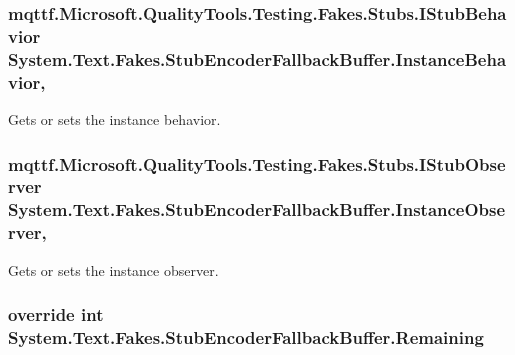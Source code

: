 \hypertarget{class_system_1_1_text_1_1_fakes_1_1_stub_encoder_fallback_buffer_a381e1be1d8d8416f28964cc2686a6ec3}{
\subsubsection[{Instance\-Behavior}]{\setlength{\rightskip}{0pt plus 5cm}mqttf.\-Microsoft.\-Quality\-Tools.\-Testing.\-Fakes.\-Stubs.\-I\-Stub\-Behavior System.\-Text.\-Fakes.\-Stub\-Encoder\-Fallback\-Buffer.\-Instance\-Behavior\hspace{0.3cm}{\ttfamily [get]}, {\ttfamily [set]}}}\label{class_system_1_1_text_1_1_fakes_1_1_stub_encoder_fallback_buffer_a381e1be1d8d8416f28964cc2686a6ec3}


Gets or sets the instance behavior.

\hypertarget{class_system_1_1_text_1_1_fakes_1_1_stub_encoder_fallback_buffer_abafad81b2ee116868d5699b2a1a67e80}{
\subsubsection[{Instance\-Observer}]{\setlength{\rightskip}{0pt plus 5cm}mqttf.\-Microsoft.\-Quality\-Tools.\-Testing.\-Fakes.\-Stubs.\-I\-Stub\-Observer System.\-Text.\-Fakes.\-Stub\-Encoder\-Fallback\-Buffer.\-Instance\-Observer\hspace{0.3cm}{\ttfamily [get]}, {\ttfamily [set]}}}\label{class_system_1_1_text_1_1_fakes_1_1_stub_encoder_fallback_buffer_abafad81b2ee116868d5699b2a1a67e80}


Gets or sets the instance observer.

\hypertarget{class_system_1_1_text_1_1_fakes_1_1_stub_encoder_fallback_buffer_aac291638a8fcb3a0d0748f45cd013646}{
\subsubsection[{Remaining}]{\setlength{\rightskip}{0pt plus 5cm}override int System.\-Text.\-Fakes.\-Stub\-Encoder\-Fallback\-Buffer.\-Remaining\hspace{0.3cm}{\ttfamily [get]}}}\label{class_system_1_1_text_1_1_fakes_1_1_stub_encoder_fallback_buffer_aac291638a8fcb3a0d0748f45cd013646}


